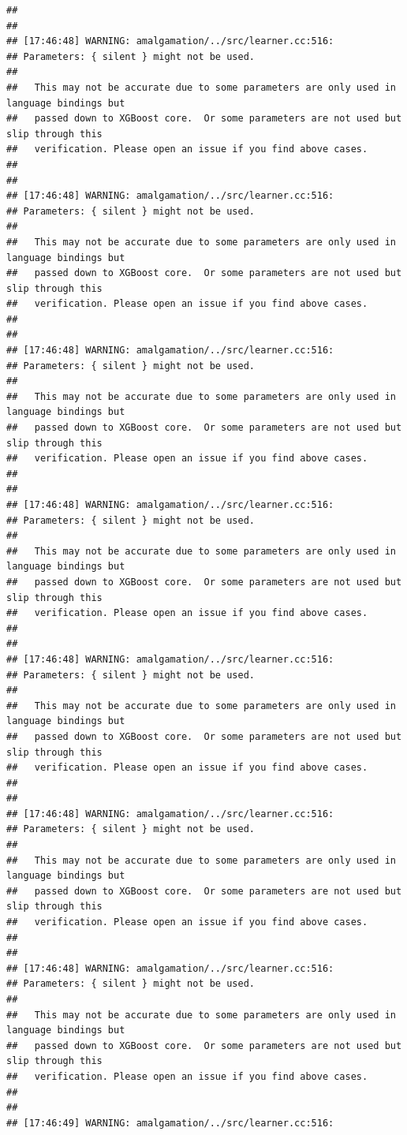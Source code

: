 \documentclass[AMS,STIX2COL]{WileyNJD-v2}\usepackage[]{graphicx}\usepackage[]{color}
\makeatletter
\newenvironment{kframe}{%
 \def\at@end@of@kframe{}%
 \ifinner\ifhmode%
  \def\at@end@of@kframe{\end{minipage}}%
  \begin{minipage}{\columnwidth}%
 \fi\fi%
 \def\FrameCommand##1{\hskip\@totalleftmargin \hskip-\fboxsep
 \colorbox{shadecolor}{##1}\hskip-\fboxsep
     \hskip-\linewidth \hskip-\@totalleftmargin \hskip\columnwidth}%
 \MakeFramed {\advance\hsize-\width
   \@totalleftmargin\z@ \linewidth\hsize
   \@setminipage}}%
 {\par\unskip\endMakeFramed%
 \at@end@of@kframe}
\newenvironment{knitrout}{}{} %
\makeatother
\begin{document}
\begin{knitrout}
\begin{kframe}
\begin{verbatim}
## 
## 
## [17:46:48] WARNING: amalgamation/../src/learner.cc:516: 
## Parameters: { silent } might not be used.
## 
##   This may not be accurate due to some parameters are only used in language bindings but
##   passed down to XGBoost core.  Or some parameters are not used but slip through this
##   verification. Please open an issue if you find above cases.
## 
## 
## [17:46:48] WARNING: amalgamation/../src/learner.cc:516: 
## Parameters: { silent } might not be used.
## 
##   This may not be accurate due to some parameters are only used in language bindings but
##   passed down to XGBoost core.  Or some parameters are not used but slip through this
##   verification. Please open an issue if you find above cases.
## 
## 
## [17:46:48] WARNING: amalgamation/../src/learner.cc:516: 
## Parameters: { silent } might not be used.
## 
##   This may not be accurate due to some parameters are only used in language bindings but
##   passed down to XGBoost core.  Or some parameters are not used but slip through this
##   verification. Please open an issue if you find above cases.
## 
## 
## [17:46:48] WARNING: amalgamation/../src/learner.cc:516: 
## Parameters: { silent } might not be used.
## 
##   This may not be accurate due to some parameters are only used in language bindings but
##   passed down to XGBoost core.  Or some parameters are not used but slip through this
##   verification. Please open an issue if you find above cases.
## 
## 
## [17:46:48] WARNING: amalgamation/../src/learner.cc:516: 
## Parameters: { silent } might not be used.
## 
##   This may not be accurate due to some parameters are only used in language bindings but
##   passed down to XGBoost core.  Or some parameters are not used but slip through this
##   verification. Please open an issue if you find above cases.
## 
## 
## [17:46:48] WARNING: amalgamation/../src/learner.cc:516: 
## Parameters: { silent } might not be used.
## 
##   This may not be accurate due to some parameters are only used in language bindings but
##   passed down to XGBoost core.  Or some parameters are not used but slip through this
##   verification. Please open an issue if you find above cases.
## 
## 
## [17:46:48] WARNING: amalgamation/../src/learner.cc:516: 
## Parameters: { silent } might not be used.
## 
##   This may not be accurate due to some parameters are only used in language bindings but
##   passed down to XGBoost core.  Or some parameters are not used but slip through this
##   verification. Please open an issue if you find above cases.
## 
## 
## [17:46:49] WARNING: amalgamation/../src/learner.cc:516: 

\end{verbatim}
\end{kframe}
\end{knitrout}
\end{document}
